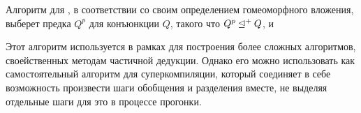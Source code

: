 Алгоритм для \forcpd, в соответствии со своим определением гомеоморфного вложения,
выберет предка $Q^p$ для конъюнкции $Q$, такого что $Q^p \unlhd^+ Q$, и

Этот алгоритм используется в рамках \forcpd для построения более сложных алгоритмов,
своейственных методам частичной дедукции. Однако его можно использовать как самостоятельный
алгоритм для суперкомпиляции, который соединяет в себе возможность произвести шаги обобщения
и разделения вместе, не выделяя отдельные шаги для это в процессе прогонки.

